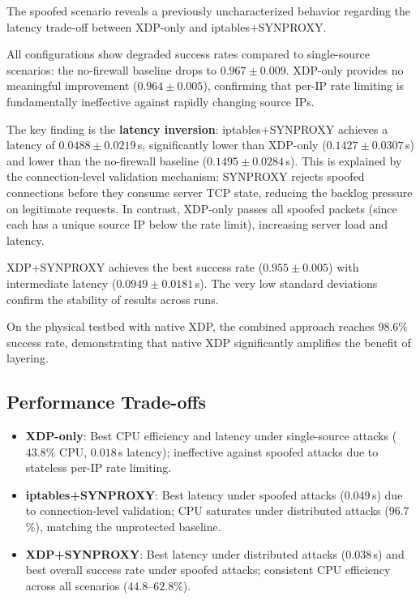 \documentclass[conference]{IEEEtran}
\begin{document}
The spoofed scenario reveals a previously uncharacterized behavior
regarding the latency trade-off between XDP-only and iptables+SYNPROXY.

All configurations show degraded success rates compared to single-source
scenarios: the no-firewall baseline drops to $0.967 \pm 0.009$.
XDP-only provides no meaningful improvement ($0.964 \pm 0.005$), confirming
that per-IP rate limiting is fundamentally ineffective against rapidly
changing source IPs.

The key finding is the \textbf{latency inversion}: iptables+SYNPROXY
achieves a latency of $0.0488 \pm 0.0219$\,s, significantly lower than
XDP-only ($0.1427 \pm 0.0307$\,s) and lower than the no-firewall baseline
($0.1495 \pm 0.0284$\,s).
This is explained by the connection-level validation mechanism: SYNPROXY
rejects spoofed connections before they consume server TCP state, reducing
the backlog pressure on legitimate requests.
In contrast, XDP-only passes all spoofed packets (since each has a unique
source IP below the rate limit), increasing server load and latency.

XDP+SYNPROXY achieves the best success rate ($0.955 \pm 0.005$) with
intermediate latency ($0.0949 \pm 0.0181$\,s).
The very low standard deviations confirm the stability of results
across runs.

On the physical testbed with native XDP, the combined approach reaches
98.6\% success rate, demonstrating that native XDP significantly amplifies
the benefit of layering.

\subsection{Performance Trade-offs}

\begin{itemize}
  \item \textbf{XDP-only}: Best CPU efficiency and latency under
        single-source attacks ($43.8$\% CPU, $0.018$\,s latency);
        ineffective against spoofed attacks due to stateless per-IP
        rate limiting.
  \item \textbf{iptables+SYNPROXY}: Best latency under spoofed attacks
        ($0.049$\,s) due to connection-level validation; CPU saturates
        under distributed attacks ($96.7$\%), matching the unprotected
        baseline.
  \item \textbf{XDP+SYNPROXY}: Best latency under distributed attacks
        ($0.038$\,s) and best overall success rate under spoofed attacks;
        consistent CPU efficiency across all scenarios
        ($44.8$--$62.8$\%).
\end{itemize}
\end{document}
